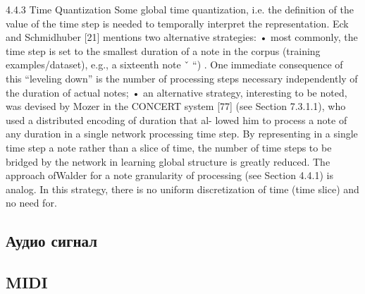 4.4.3 Time Quantization
Some global time quantization, i.e. the definition of the value of the time step is needed to temporally interpret the representation. Eck and Schmidhuber [21] mentions two alternative strategies:
• most commonly, the time step is set to the smallest duration of a note in the corpus
(training examples/dataset), e.g., a sixteenth note ˇ “) . One immediate consequence of this “leveling down” is the number of processing steps necessary independently of the duration of actual notes;
• an alternative strategy, interesting to be noted, was devised by Mozer in the CONCERT system [77] (see Section 7.3.1.1), who used a distributed encoding of duration that al-
lowed him to process a note of any duration in a single network processing time step. By representing in a single time step a note rather than a slice of time, the number of time steps to be bridged by the network in learning global structure is greatly reduced. The approach ofWalder for a note granularity of processing (see Section 4.4.1) is analog. In this strategy, there is no uniform discretization of time (time slice) and no need for.

\subsection{Аудио сигнал}

\subsection{MIDI}

